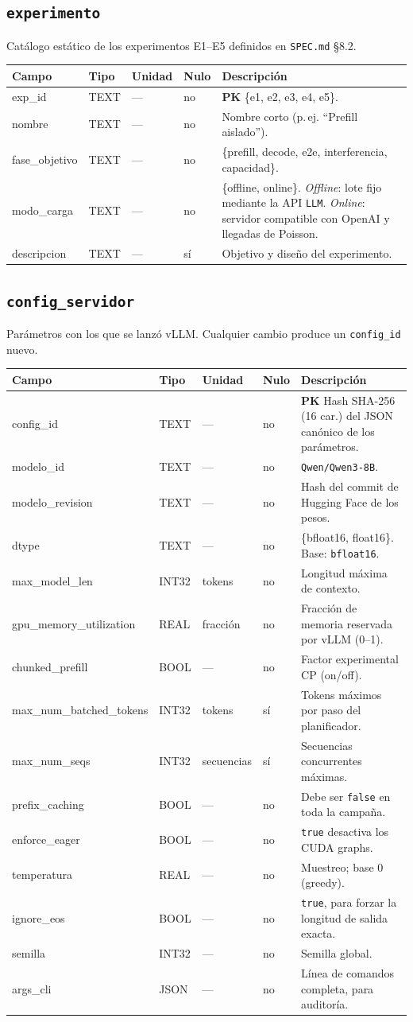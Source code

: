 \documentclass[11pt,a4paper]{article}
\makeatletter
\newcommand{\PK}{\textcolor{pkc}{\textbf{PK}}}
\newenvironment{diccionario}{%
  \small
  \begin{longtable}{@{}>{\raggedright\ttfamily}p{3.4cm}>{\raggedright}p{2.2cm}>{\raggedright}p{1.6cm}p{0.9cm}>{\raggedright\arraybackslash}p{5.8cm}@{}}
  \toprule
  \normalfont\textbf{Campo} & \textbf{Tipo} & \textbf{Unidad} & \textbf{Nulo} & \textbf{Descripción}\\
  \midrule\endhead
  \bottomrule\endfoot
}{\end{longtable}}
\makeatother
\begin{document}
\subsection{\texttt{experimento}}
Catálogo estático de los experimentos E1–E5 definidos en \texttt{SPEC.md} §8.2.
\begin{diccionario}
exp_id & TEXT & — & no & \PK{} \{e1, e2, e3, e4, e5\}.\\
nombre & TEXT & — & no & Nombre corto (p.\,ej. ``Prefill aislado'').\\
fase_objetivo & TEXT & — & no & \{prefill, decode, e2e, interferencia, capacidad\}.\\
modo_carga & TEXT & — & no & \{offline, online\}. \emph{Offline}: lote fijo mediante la API \texttt{LLM}. \emph{Online}: servidor compatible con OpenAI y llegadas de Poisson.\\
descripcion & TEXT & — & sí & Objetivo y diseño del experimento.\\
\end{diccionario}

\subsection{\texttt{config_servidor}}
Parámetros con los que se lanzó vLLM. Cualquier cambio produce un \texttt{config_id} nuevo.
\begin{diccionario}
config_id & TEXT & — & no & \PK{} Hash SHA-256 (16 car.) del JSON canónico de los parámetros.\\
modelo_id & TEXT & — & no & \texttt{Qwen/Qwen3-8B}.\\
modelo_revision & TEXT & — & no & Hash del commit de Hugging Face de los pesos.\\
dtype & TEXT & — & no & \{bfloat16, float16\}. Base: \texttt{bfloat16}.\\
max_model_len & INT32 & tokens & no & Longitud máxima de contexto.\\
gpu_memory_utilization & REAL & fracción & no & Fracción de memoria reservada por vLLM (0–1).\\
chunked_prefill & BOOL & — & no & Factor experimental CP (on/off).\\
max_num_batched_tokens & INT32 & tokens & sí & Tokens máximos por paso del planificador.\\
max_num_seqs & INT32 & secuencias & sí & Secuencias concurrentes máximas.\\
prefix_caching & BOOL & — & no & Debe ser \texttt{false} en toda la campaña.\\
enforce_eager & BOOL & — & no & \texttt{true} desactiva los CUDA graphs.\\
temperatura & REAL & — & no & Muestreo; base 0 (greedy).\\
ignore_eos & BOOL & — & no & \texttt{true}, para forzar la longitud de salida exacta.\\
semilla & INT32 & — & no & Semilla global.\\
args_cli & JSON & — & no & Línea de comandos completa, para auditoría.\\
\end{diccionario}
\end{document}

